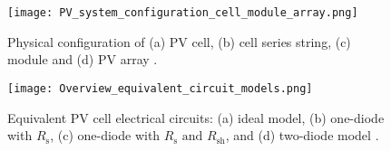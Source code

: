 \begin{figure}
    \centering
    \texttt{[image: PV\_system\_configuration\_cell\_module\_array.png]}
    \caption{\small Physical configuration of (a) PV cell, (b) cell series string, (c) module
             and (d) PV array \cite{Ma2014_1}.}
    \label{fig:PV_system_configuration_cell_module_array}
\end{figure}

\begin{figure}
    \centering
    \texttt{[image: Overview\_equivalent\_circuit\_models.png]}
    \caption{\small Equivalent PV cell electrical circuits: (a) ideal model,
        (b) one-diode with \(R_{\text{s}}\), (c) one-diode with \(R_{\text{s}} \text{ and } R_{\text{sh}}\),
        and (d) two-diode model \cite{Ma2014_1}.}
        \label{fig:Overview_equivalent_circuit_models}
\end{figure}
